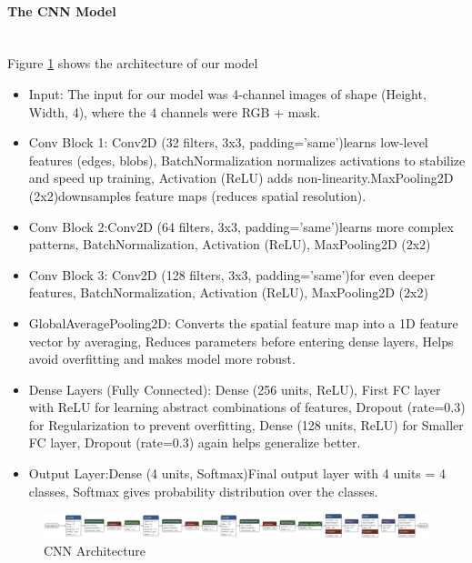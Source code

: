 \documentclass{article}
\begin{document}
\paragraph{The CNN Model}\mbox{}\\
Figure \ref{fig:model_cnnmask1.keras.png} shows the architecture of our model

\begin{itemize}
    \item Input: The input for our model was 4-channel images of shape (Height, Width, 4), where the 4 channels were  RGB + mask.
    \item Conv Block 1: Conv2D (32 filters, 3x3, padding='same')learns low-level features (edges, blobs), BatchNormalization normalizes activations to stabilize and speed up training, Activation (ReLU) adds non-linearity.MaxPooling2D (2x2)downsamples feature maps (reduces spatial resolution).
    \item Conv Block 2:Conv2D (64 filters, 3x3, padding='same')learns more complex patterns, BatchNormalization, Activation (ReLU), MaxPooling2D (2x2)
    \item Conv Block 3:	Conv2D (128 filters, 3x3, padding='same')for even deeper features, BatchNormalization,	Activation (ReLU), MaxPooling2D (2x2)
    \item GlobalAveragePooling2D: Converts the spatial feature map into a 1D feature vector by averaging, Reduces parameters before entering dense layers,	Helps avoid overfitting and makes model more robust.
    \item Dense Layers (Fully Connected): Dense (256 units, ReLU), First FC layer with ReLU for learning abstract combinations of features, Dropout (rate=0.3) for Regularization to prevent overfitting, Dense (128 units, ReLU) for Smaller FC layer,	Dropout (rate=0.3) again helps generalize better.
    \item Output Layer:Dense (4 units, Softmax)Final output layer with 4 units = 4 classes, Softmax gives probability distribution over the classes.
\end{itemize}


\begin{figure}[h!] %
    \centering
    \includegraphics[width=1.0\linewidth]{model_cnnmask1.keras.png}
    \caption{CNN Architecture}
    \label{fig:model_cnnmask1.keras.png}
\end{figure}
\end{document}
